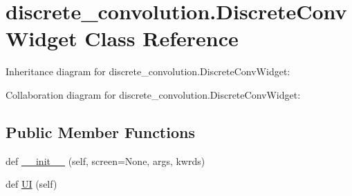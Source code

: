 \hypertarget{classdiscrete__convolution_1_1DiscreteConvWidget}{}\section{discrete\+\_\+convolution.\+Discrete\+Conv\+Widget Class Reference}
\label{classdiscrete__convolution_1_1DiscreteConvWidget}


Inheritance diagram for discrete\+\_\+convolution.\+Discrete\+Conv\+Widget\+:


Collaboration diagram for discrete\+\_\+convolution.\+Discrete\+Conv\+Widget\+:
\subsection*{Public Member Functions}
\begin{DoxyCompactItemize}
\item 
def \hyperlink{classdiscrete__convolution_1_1DiscreteConvWidget_a703204ccab9e5d252f132f4aec289215}{\+\_\+\+\_\+init\+\_\+\+\_\+} (self, screen=None, args, kwrds)
\item 
def \hyperlink{classdiscrete__convolution_1_1DiscreteConvWidget_a2b2aeac10f3ca7f36cc2114844d23f27}{UI} (self)
\end{DoxyCompactItemize}

